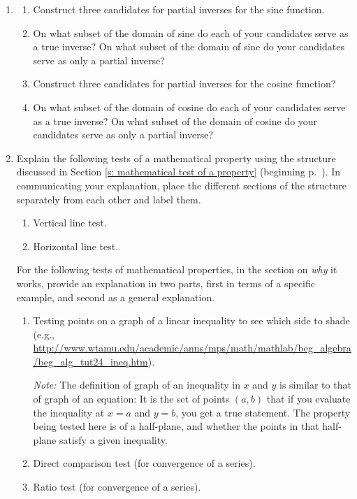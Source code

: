 \documentclass[11pt]{article}
\theoremstyle{definition}
\begin{document}
\begin{enumerate}[resume]
\item %
	\begin{enumerate}
	\item Construct three candidates for partial inverses for the sine function.
	\item On what subset of the domain of sine do each of your candidates serve as a true inverse? On what subset of the domain of sine do your candidates serve as only a partial inverse?
	\item Construct three candidates for partial inverses for the cosine function?
	\item On what subset of the domain of cosine do each of your candidates serve as a true inverse? On what subset of the domain of cosine do your candidates serve as only a partial inverse?
	\end{enumerate}
	
\item  Explain the following tests of a mathematical property using the structure 
discussed in Section \ref{s: mathematical test of a property} (beginning p.~\pageref{s: mathematical test of a property}). In communicating your explanation, place the different sections of the structure separately from each other and label them.
	\begin{enumerate}
	\item Vertical line test.
	\item Horizontal line test.
	\end{enumerate}
	For the following tests of mathematical properties, in the section on {\it why} it works, provide an explanation in two parts, first in terms of a specific example, and second as a general explanation.
	\begin{enumerate}[resume]
	\item Testing points on a graph of a linear inequality to see which side to shade (e.g., \url{http://www.wtamu.edu/academic/anns/mps/math/mathlab/beg_algebra/beg_alg_tut24_ineq.htm}).
	
	{\it Note:} The definition of graph of an inequality in $x$ and $y$ is similar to that of graph of an equation: It is the set of points $(a, b)$ that if you evaluate the inequality at $x=a$ and $y=b$, you get a true statement. The property being tested here is of a half-plane, and whether the points in that half-plane satisfy a given inequality.
	
	\item Direct comparison test (for convergence of a series).
	\item Ratio test (for convergence of a series).
	\end{enumerate}


\end{enumerate}
\end{document}
